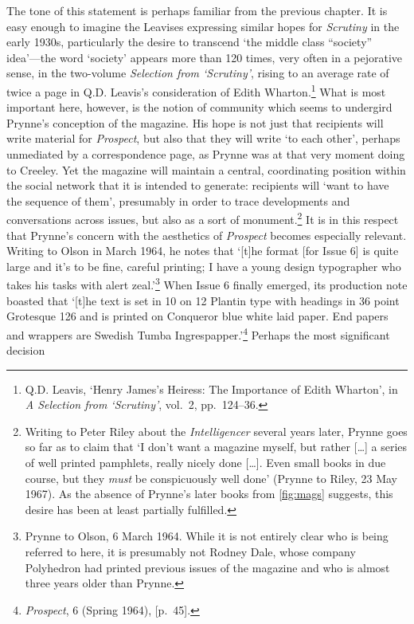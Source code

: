 \documentclass[]{article}
\begin{document}
The tone of this statement is perhaps familiar from the previous
chapter. It is easy enough to imagine the Leavises expressing similar
hopes for \emph{Scrutiny} in the early 1930s, particularly the desire to
transcend `the middle class ``society'' idea'---the word `society'
appears more than 120 times, very often in a pejorative sense, in the
two-volume \emph{Selection from `Scrutiny'}, rising to an average rate
of twice a page in Q.D. Leavis's consideration of Edith
Wharton.\footnote{Q.D. Leavis, `Henry James's Heiress: The Importance of
  Edith Wharton', in \emph{A Selection from `Scrutiny'}, vol.~2,
  pp.~124--36.} What is most important here, however, is the notion of
community which seems to undergird Prynne's conception of the magazine.
His hope is not just that recipients will write material for
\emph{Prospect}, but also that they will write `to each other', perhaps
unmediated by a correspondence page, as Prynne was at that very moment
doing to Creeley. Yet the magazine will maintain a central, coordinating
position within the social network that it is intended to generate:
recipients will `want to have the sequence of them', presumably in order
to trace developments and conversations across issues, but also as a
sort of monument.\footnote{Writing to Peter Riley about the
  \emph{Intelligencer} several years later, Prynne goes so far as to
  claim that `I don't want a magazine myself, but rather {[}\ldots{}{]}
  a series of well printed pamphlets, really nicely done {[}\ldots{}{]}.
  Even small books in due course, but they \emph{must} be conspicuously
  well done' (Prynne to Riley, 23 May 1967). As the absence of Prynne's
  later books from \ref{fig:mags} suggests, this desire has been at
  least partially fulfilled.} It is in this respect that Prynne's
concern with the aesthetics of \emph{Prospect} becomes especially
relevant. Writing to Olson in March 1964, he notes that `{[}t{]}he
format {[}for Issue 6{]} is quite large and it's to be fine, careful
printing; I have a young design typographer who takes his tasks with
alert zeal.'\footnote{Prynne to Olson, 6 March 1964. While it is not
  entirely clear who is being referred to here, it is presumably not
  Rodney Dale, whose company Polyhedron had printed previous issues of
  the magazine and who is almost three years older than Prynne.} When
Issue 6 finally emerged, its production note boasted that `{[}t{]}he
text is set in 10 on 12 Plantin type with headings in 36 point Grotesque
126 and is printed on Conqueror blue white laid paper. End papers and
wrappers are Swedish Tumba Ingrespapper.'\footnote{\emph{Prospect}, 6
  (Spring 1964), {[}p.~45{]}.} Perhaps the most significant decision
\end{document}
